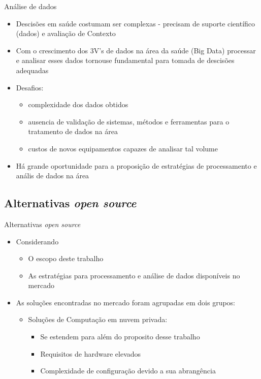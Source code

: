 \documentclass[10pt,brazil]{beamer}
\theoremstyle{definition}
\begin{document}
\begin{frame}{Análise de dados}
  \begin{itemize}
    \item Descisões em saúde costumam ser complexas - precisam de suporte científico (dados) e avaliação de Contexto
    \item Com o crescimento dos 3V's de dados na área da saúde (Big Data) processar e analisar esses dados tornouse fundamental para tomada de descisões adequadas
    \item Desafios:
          \begin{itemize}
            \item complexidade dos dados obtidos
            \item ausencia de validação de sistemas, métodos e ferramentas para o tratamento de dados na área
            \item custos de novos equipamentos capazes de analisar tal volume
          \end{itemize}
    \item Há grande oportunidade para a proposição de estratégias de processamento e anális de dados na área
  \end{itemize}
\end{frame}

\subsection{Alternativas \emph{open source}}

\begin{frame}{Alternativas \emph{open source}}
  \begin{itemize}
    \item Considerando
          \begin{itemize}
            \item O escopo deste trabalho
            \item As estratégias para processamento e análise de dados disponíveis no mercado
          \end{itemize}
    \item [] As soluções encontradas no mercado foram agrupadas em dois grupos:
          \begin{itemize}
            \item Soluções de Computação em nuvem privada:
                  \begin{itemize}
                    \item Se estendem para além do proposito desse trabalho
                    \item Requisitos de hardware elevados
                    \item Complexidade de configuração devido a sua abrangência
                  \end{itemize}
          \end{itemize}
  \end{itemize}
\end{frame}
\end{document}
